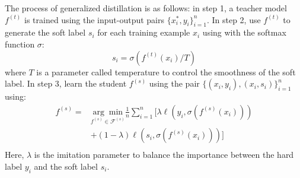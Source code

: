 The process of generalized distillation is as follows: in step 1, a teacher model ${f}^{(t)}$ is trained using the input-output pairs $\{x^*_i,y_i\}_{i=1}^n$. In step 2, use ${f}^{(t)}$ to generate the soft label $s_i$ for each training example $x_i$ using with the softmax function $\sigma$:
\begin{equation}\label{eq:softmax_T}
s_i=\sigma(f^{(t)}(x_i)/T)
\end{equation}
where $T$ is a parameter called temperature to control the smoothness of the soft label. In step 3, learn the student ${f}^{(s)}$ using the pair $\{\left(x_i,y_i\right),\left(x_i,s_i\right)\}_{i=1}^n$ using:
\begin{equation}\label{eq:distill}
\begin{aligned}
f^{(s)}=&\underset{f^{(s)} \in \mathcal{F}^{(s)}}{\arg \min}\frac{1}{n}\sum_{i=1}^{n}[\lambda\ell\left(y_i,\sigma(f^{(s)}(x_i))\right)\\
&+(1-\lambda)\ell\left(s_i,\sigma(f^{(s)}(x_i))\right)]\\
\end{aligned}
\end{equation}
Here, $\lambda$ is the imitation parameter to balance the importance between the hard label $y_i$ and the soft label $s_i$.

